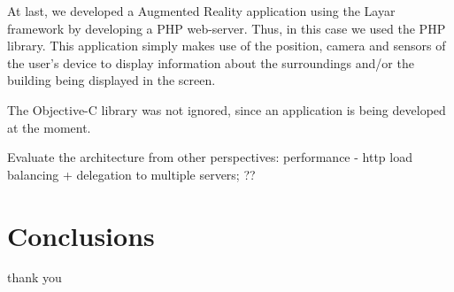 \documentclass[times]{ettauth}
\begin{document}
At last, we developed a Augmented Reality application using the Layar framework by developing a PHP web-server. Thus, in this case we used the PHP library. This application simply makes use of the position, camera and sensors of the user's device to display information about the surroundings and/or the building being displayed in the screen.

The Objective-C library was not ignored, since an application is being developed at the moment.

Evaluate the architecture from other perspectives: performance - http load balancing + delegation to multiple servers; ??



\section{Conclusions}


\acks
thank you



\end{document}
